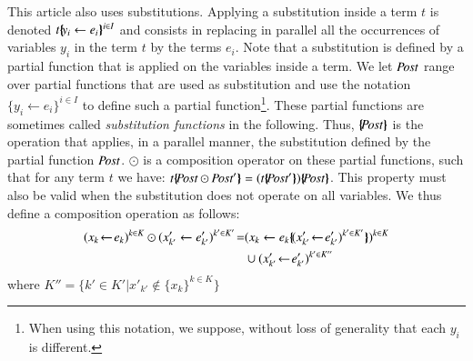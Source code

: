 \documentclass{elsarticle}
\newcommand{\TODO}[1]{\textcolor{red}{\textbf{[TODO:#1]}}}
\newcommand{\ERIC}[1]{\textcolor{blue}{#1}}
\newcommand{\LUDO}[1]{\textcolor{darkgreen}{#1}}
\newcommand{\shortotimes}{\!\otimes\!}
\begin{document}
This article also uses substitutions. Applying a substitution inside a term $t$ is denoted $t\{\hspace{-0.68ex}\{\!y_i\gets e_i\}\hspace{-0.67ex}\}^{i\in I}$ and consists in replacing in parallel all the occurrences of variables $y_i$ in the term $t$ by the terms $e_i$. Note that a substitution is defined by a partial function that is applied on the variables inside a term. We let $\Post$ range over partial functions that are used as substitution and use the notation $\{y_i\gets e_i\}^{i\in I}$ to define such a partial function\footnote{When using this notation, we suppose, without loss of generality that each $y_i$ is different.}. These partial functions are sometimes called \emph{substitution functions} in the following. Thus,
 $\subst{\Post}$ is  the operation that applies,  in a parallel manner,  the substitution defined by the partial function $\Post$. $\odot$ is a composition operator on these partial functions, such that for any term $t$ we have: $t\subst{\Post\odot\Post'} = (t\subst{\Post'})\subst{\Post}$.
This property must also be valid when the substitution does not operate on all variables.
We thus define a composition operation as follows: 
%
\begin{align*}
(x_{k}\!\gets\! e_{k})^{k\in K}\odot (x'_{k'}\gets e'_{k'})^{k'\in K'} \!=&  
(x_{k}\gets e_{k}\subst{(x'_{k'}\!\gets\! e'_{k'})^{k'\in K'}})^{k\in K} \\&\cup (x'_{k'}\!\gets\! e'_{k'})^{k'\in K''}
\end{align*}where $K''=\{k'\in K'|x'_{k'}\not\in\{x_k\}^{k\in K}\}$
%
%
% 
\end{document}
